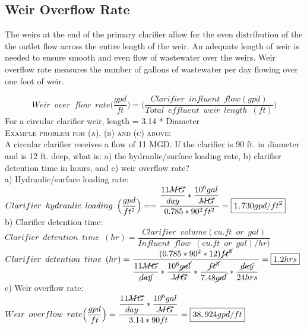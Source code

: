 \subsection{Weir Overflow Rate}
The weirs at the end of the primary clarifier allow for the even distribution of the the outlet flow across the entire length of the weir.  An adequate length of weir is needed to ensure smooth and even flow of wastewater over the weirs.  Weir overflow rate measures the number of gallons of wastewater per day flowing over one foot of weir. 

		$$Weir \enspace over \enspace flow \enspace rate \Big(\dfrac{gpd}{ft}\Big) =\Big(\dfrac{Clarifier \enspace influent \enspace  flow (gpd)}{Total \enspace effluent 					\enspace weir \enspace length \enspace (ft)}\Big)$$
		For a circular clarifier weir, length = 3.14 * Diameter\\
\vspace{0.2cm}
\noindent\textsc{Example problem for (a), (b) and (c) above:}\\
		\vspace{0.2cm}
A circular clarifier receives a flow of 11 MGD.  If the clarifier is 90 ft. in diameter and is 12 ft. deep, what is: a) the hydraulic/surface loading rate, b) clarifier detention time in hours, and c) weir overflow rate?\\
		\vspace{0.2cm}
a) Hydraulic/surface loading rate:\\
$Clarifier \enspace hydraulic \enspace loading \enspace 	\Big(\dfrac{gpd}{ft^2}\Big) ==\dfrac{\dfrac{11\cancel{MG}}{{day}}*\dfrac{10^6gal}{\cancel{MG}}}{0.785*90^2 ft^2}=\boxed{1,730gpd/ft^2}$\\
		\vspace{0.5cm}
b) Clarifier detention time:\\
$Clarifier \enspace detention \enspace time \enspace (hr) = 	\dfrac{ Clarifier \enspace volume (cu.ft \enspace or \enspace gal)}{Influent \enspace flow \enspace (cu.ft \enspace or \enspace gal)/hr)}$\\
		\vspace{0.2cm}
$Clarifier \enspace detention \enspace time \enspace (hr) = 	\dfrac{(0.785*90^2*12)\cancel{ft^3}}{\dfrac{11\cancel{MG}}{\cancel{day}}*\dfrac{10^6\cancel{gal}}{\cancel{MG}}*\dfrac{\cancel{ft^3}}{7.48\cancel{gal}}*\dfrac{\cancel{day}}{24hrs}}=\boxed{1.2hrs}$\\
		\vspace{0.5cm}
c) Weir overflow rate:\\
		\vspace{0.2cm} 
$Weir \enspace overflow \enspace rate \Big(\dfrac{gpd}{ft}\Big) =\dfrac{\dfrac{11\cancel{MG}}{{day}}*\dfrac{10^6gal}{\cancel{MG}}}{3.14*90 ft}=\boxed{38,924gpd/ft}$\\

